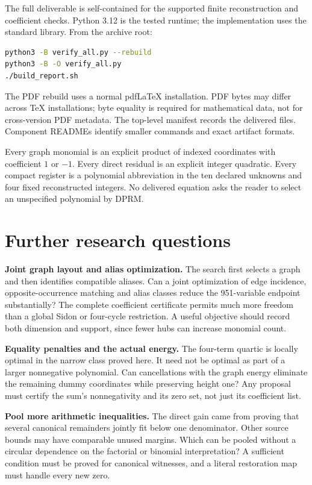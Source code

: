 \documentclass[11pt,letterpaper]{article}
\theoremstyle{definition}\newtheorem{definition}[theorem]{Definition}
\theoremstyle{remark}\newtheorem{remark}[theorem]{Remark}
\begin{document}
The full deliverable is self-contained for the supported finite
reconstruction and coefficient checks. Python 3.12 is the tested runtime;
the implementation uses the standard library. From the archive root:
\begin{lstlisting}[language=bash]
python3 -B verify_all.py --rebuild
python3 -B -O verify_all.py
./build_report.sh
\end{lstlisting}
The PDF rebuild uses a normal pdfLaTeX installation. PDF bytes may differ
across TeX installations; byte equality is required for mathematical data,
not for cross-version PDF metadata. The top-level manifest records the
delivered files. Component READMEs identify smaller commands and exact
artifact formats.

Every graph monomial is an explicit product of indexed coordinates with
coefficient \(1\) or \(-1\). Every direct residual is an explicit integer
quadratic. Every compact register is a polynomial abbreviation in the ten
declared unknowns and four fixed reconstructed integers. No delivered
equation asks the reader to select an unspecified polynomial by DPRM.

\section{Further research questions}

\textbf{Joint graph layout and alias optimization.}
The search first selects a graph and then identifies compatible aliases.
Can a joint optimization of edge incidence, opposite-occurrence matching
and alias classes reduce the 951-variable endpoint substantially? The
complete coefficient certificate permits much more freedom than a global
Sidon or four-cycle restriction. A useful objective should record both
dimension and support, since fewer hubs can increase monomial count.

\textbf{Equality penalties and the actual energy.}
The four-term quartic is locally optimal in the narrow class proved here.
It need not be optimal as part of a larger nonnegative polynomial.
Can cancellations with the graph energy eliminate the remaining dummy
coordinates while preserving height one? Any proposal must certify the
sum's nonnegativity and its zero set, not just its coefficient list.

\textbf{Pool more arithmetic inequalities.}
The direct gain came from proving that several canonical remainders
jointly fit below one denominator. Other source bounds may have comparable
unused margins. Which can be pooled without a circular dependence on the
factorial or binomial interpretation? A sufficient condition must be proved
for canonical witnesses, and a literal restoration map must handle every
new zero.
\end{document}
